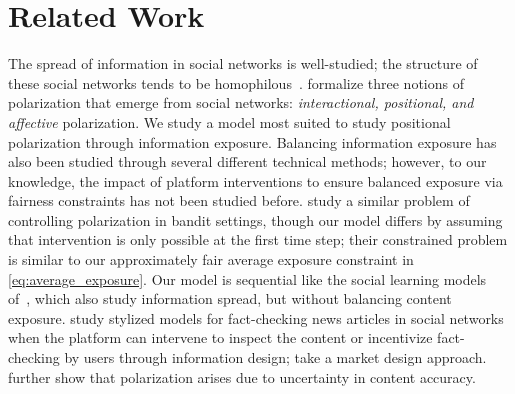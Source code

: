 \documentclass[letterpaper]{article} %
\begin{document}
\section{Related Work}\label{sec:background_and_related_work}

The spread of information in social networks is well-studied; the structure of these social networks tends to be homophilous~\citep{mcpherson2001birds,lazarsfeld1948mass}.
%
\citet{Yarchi2020PoliticalPO} formalize three notions of polarization that emerge from social networks: \emph{interactional, positional, and affective} polarization.
We study a model most suited to study positional polarization through information exposure.
Balancing information exposure has also been studied through several different technical methods; however, to our knowledge, the impact of platform interventions to ensure balanced exposure via fairness constraints has not been studied before.
%
\citet{celis2019controlling} study a similar problem of controlling polarization in bandit settings, though our model differs by assuming that intervention is only possible at the first time step; their constrained problem is similar to our approximately fair average exposure constraint in \eqref{eq:average_exposure}.
%
Our model is sequential like the social learning models of~\citet{banerjee1992simple,bikhchandani1992theory}, which also study information spread, but without balancing content exposure.
%
\citet{papanastasiou2020fake,candogan2020optimal} study stylized models for fact-checking news articles in social networks when the platform can intervene to inspect the content or incentivize fact-checking by users through information design; 
\citet{cisternas2020fake} take a market design approach. 
%
\citet{allon2019information} further show that polarization arises due to  uncertainty in content accuracy. 
\end{document}
